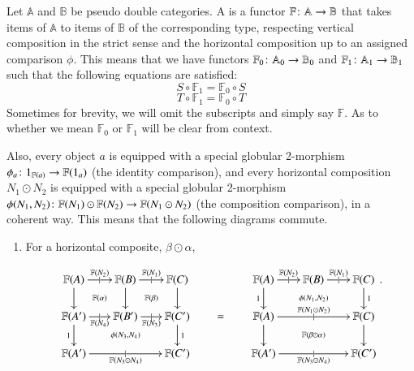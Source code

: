\documentclass[reqno]{amsart}
\begin{document}
\begin{defn}
Let $\mathbb{A}$ and $\mathbb{B}$ be pseudo double categories. A  is a functor $\mathbb{F} \colon\mathbb{A}\to \mathbb{B}$ that takes items of $\mathbb{A}$ to items of $\mathbb{B}$ of the corresponding type, respecting vertical composition in the strict sense and the horizontal composition up to an assigned comparison $\phi$. This means that we have functors $\mathbb{F}_0 \colon \mathbb{A}_0 \to \mathbb{B}_0$ and $\mathbb{F}_1 \colon \mathbb{A}_1 \to \mathbb{B}_1$ such that the following equations are satisfied: $$S \circ \mathbb{F}_1 = \mathbb{F}_0 \circ S$$ $$T \circ \mathbb{F}_1 = \mathbb{F}_0 \circ T$$ Sometimes for brevity, we will omit the subscripts and simply say $\mathbb{F}$. As to whether we mean $\mathbb{F}_0$ or $\mathbb{F}_1$ will be clear from context.

Also, every object $a$ is equipped with a special globular 2-morphism $\phi_{a} \colon 1_{\mathbb{F}(a)} \to \mathbb{F}(1_{a})$ (the identity comparison), and every horizontal composition $N_1 \odot N_{2}$ is equipped with a special globular 2-morphism $\phi(N_1,N_{2}) \colon \mathbb{F}(N_1) \odot \mathbb{F}(N_{2}) \to \mathbb{F}(N_1 \odot N_{2})$ (the composition comparison), in a coherent way. This means that the following diagrams commute.

\begin{enumerate}

\item For a horizontal composite, $\beta \odot \alpha$,


\begin{equation}\label{eq:square}
  \xymatrix@-.5pc{
    \mathbb{F}(A) \ar[r]|{|}^{\mathbb{F}(N_{2})}  \ar[d] \ar@{}[dr]|{\mathbb{F}(\alpha)}&
    \mathbb{F}(B) \ar[d] \ar[r]|{|}^{\mathbb{F}(N_1)} \ar@{}[dr]|{\mathbb{F}(\beta)}&
    \mathbb{F}(C) \ar[d] &
     &
    \mathbb{F}(A) \ar[r]|{|}^{\mathbb{F}(N_{2})} \ar@{}[drr]|{\phi(N_1,N_{2})} \ar[d]_1 &
    \mathbb{F}(B) \ar[r]|{|}^{\mathbb{F}(N_1)} &
    \mathbb{F}(C) \ar[d]^{1} \\
    \mathbb{F}(A') \ar[r]|{|}_{\mathbb{F}(N_{4})} \ar@{}[drr]|{\phi(N_{3},N_{4})} \ar[d]_1&
    \mathbb{F}(B') \ar[r]|{|}_{\mathbb{F}(N_{3})} &
    \mathbb{F}(C') \ar[d]^{1}&
    = &
    \mathbb{F}(A) \ar[rr]|{|}^{\mathbb{F}(N_1 \odot N_{2})} \ar[d] \ar@{}[drr]|{\mathbb{F}(\beta \odot \alpha)}&
     &
    \mathbb{F}(C) \ar[d] \\
    \mathbb{F}(A') \ar[rr]|{|}_{\mathbb{F}(N_{3} \odot N_{4})} & 
     & 
    \mathbb{F}(C') &
     &
    \mathbb{F}(A') \ar[rr]|{|}_{\mathbb{F}(N_{3} \odot N_{4})} &
     &
    \mathbb{F}(C') \\
  }.
\end{equation}


\end{enumerate}
\end{defn}
\end{document}
